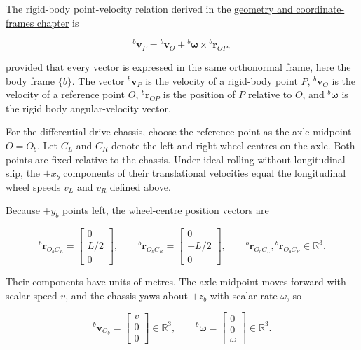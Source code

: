 \documentclass[
  australian,
  12pt,
  letterpaper,
  DIV=11,
  numbers=noendperiod,
  twoside]{scrreprt}
\begin{document}
The rigid-body point-velocity relation derived in the
\hyperref[sec-geometry-coordinate-frames]{geometry and coordinate-frames
chapter} is

\[
{}^{b}\mathbf v_P
=
{}^{b}\mathbf v_O
+
{}^{b}\boldsymbol{\omega}\times{}^{b}\mathbf r_{OP},
\]

provided that every vector is expressed in the same orthonormal frame,
here the body frame \(\{b\}\). The vector \({}^{b}\mathbf v_P\) is the
velocity of a rigid-body point \(P\), \({}^{b}\mathbf v_O\) is the
velocity of a reference point \(O\), \({}^{b}\mathbf r_{OP}\) is the
position of \(P\) relative to \(O\), and \({}^{b}\boldsymbol{\omega}\)
is the rigid body angular-velocity vector.

For the differential-drive chassis, choose the reference point as the
axle midpoint \(O=O_b\). Let \(C_L\) and \(C_R\) denote the left and
right wheel centres on the axle. Both points are fixed relative to the
chassis. Under ideal rolling without longitudinal slip, the \(+x_b\)
components of their translational velocities equal the longitudinal
wheel speeds \(v_L\) and \(v_R\) defined above.

Because \(+y_b\) points left, the wheel-centre position vectors are

\[
{}^{b}\mathbf r_{O_bC_L}
=
\begin{bmatrix}0\\L/2\\0\end{bmatrix},
\qquad
{}^{b}\mathbf r_{O_bC_R}
=
\begin{bmatrix}0\\-L/2\\0\end{bmatrix},
\qquad
{}^{b}\mathbf r_{O_bC_L},{}^{b}\mathbf r_{O_bC_R}\in\mathbb R^3.
\]

Their components have units of metres. The axle midpoint moves forward
with scalar speed \(v\), and the chassis yaws about \(+z_b\) with scalar
rate \(\omega\), so

\[
{}^{b}\mathbf v_{O_b}
=
\begin{bmatrix}v\\0\\0\end{bmatrix}
\in\mathbb R^3,
\qquad
{}^{b}\boldsymbol{\omega}
=
\begin{bmatrix}0\\0\\\omega\end{bmatrix}
\in\mathbb R^3.
\]
\end{document}
